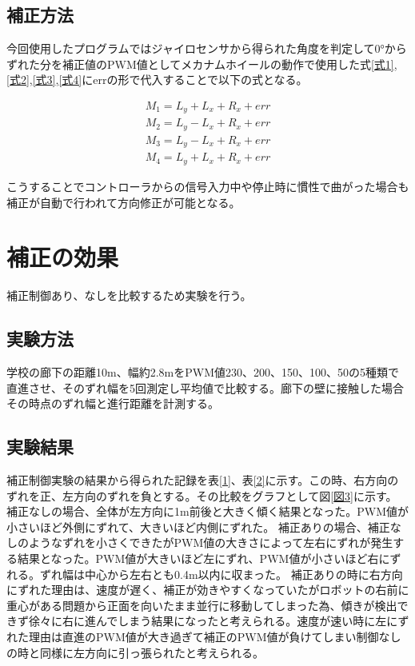 \documentclass[12pt,oneside]{sotsuken_paper}
\begin{document}
		\subsection{補正方法}
		今回使用したプログラムではジャイロセンサから得られた角度を判定して0°からずれた分を補正値のPWM値としてメカナムホイールの動作で使用した式\ref{式1},\ref{式2},\ref{式3},\ref{式4}にerrの形で代入することで以下の式となる。

\begin{eqnarray}
M_1 = L_y + L_x + R_x + err
\\
M_2 = L_y - L_x + R_x + err
\\
M_3 = L_y - L_x + R_x + err
\\
M_4 = L_y + L_x + R_x + err
\end{eqnarray}

こうすることでコントローラからの信号入力中や停止時に慣性で曲がった場合も補正が自動で行われて方向修正が可能となる。

	\section{補正の効果}
	補正制御あり、なしを比較するため実験を行う。

		\subsection{実験方法}
		学校の廊下の距離10m、幅約2.8mをPWM値230、200、150、100、50の5種類で直進させ、そのずれ幅を5回測定し平均値で比較する。廊下の壁に接触した場合その時点のずれ幅と進行距離を計測する。

		\subsection{実験結果}
		
		補正制御実験の結果から得られた記録を表\ref{1}、表\ref{2}に示す。この時、右方向のずれを正、左方向のずれを負とする。その比較をグラフとして図\ref{図3}に示す。
補正なしの場合、全体が左方向に1m前後と大きく傾く結果となった。PWM値が小さいほど外側にずれて、大きいほど内側にずれた。
補正ありの場合、補正なしのようなずれを小さくできたがPWM値の大きさによって左右にずれが発生する結果となった。PWM値が大きいほど左にずれ、PWM値が小さいほど右にずれる。ずれ幅は中心から左右とも0.4m以内に収まった。
補正ありの時に右方向にずれた理由は、速度が遅く、補正が効きやすくなっていたがロボットの右前に重心がある問題から正面を向いたまま並行に移動してしまった為、傾きが検出できず徐々に右に進んでしまう結果になったと考えられる。速度が速い時に左にずれた理由は直進のPWM値が大き過ぎて補正のPWM値が負けてしまい制御なしの時と同様に左方向に引っ張られたと考えられる。
\end{document}
